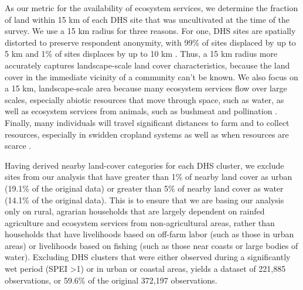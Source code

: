 \documentclass{article}
\begin{document}
As our metric for the availability of ecosystem services, we determine the fraction of land within 15 km of each DHS site that was uncultivated at the time of the survey.  We use a 15 km radius for three reasons.  For one, DHS sites are spatially distorted to preserve respondent anonymity, with 99\% of sites displaced by up to 5 km and 1\% of sites displaces by up to 10 km \cite{Grace2012}.  Thus, a 15 km radius more accurately captures landscape-scale land cover characteristics, because the land cover in the immediate vicinity of a community can't be known.  We also focus on a 15 km, landscape-scale area because many ecosystem services flow over large scales, especially abiotic resources that move through space, such as water, as well as ecosystem services from animals, such as bushmeat and pollination \cite{Lopez-Hoffman2010}.  Finally, many individuals will travel significant distances to farm and to collect resources, especially in swidden cropland systems as well as when resources are scarce \cite{Felardo2016, Arku2010}.

Having derived nearby land-cover categories for each DHS cluster, we exclude sites from our analysis that have greater than 1\% of nearby land cover as urban (19.1\% of the original data) or greater than 5\% of nearby land cover as water (14.1\% of the original data).  This is to ensure that we are basing our analysis only on rural, agrarian households that are largely dependent on rainfed agriculture and ecosystem services from non-agricultural areas, rather than households that have livelihoods based on off-farm labor (such as those in urban areas) or livelihoods based on fishing (such as those near coasts or large bodies of water).  Excluding DHS clusters that were either observed during a significantly wet period (SPEI \textgreater 1) or in urban or coastal areas, yields a dataset of 221,885 observations, or 59.6\% of the original 372,197 observations.
\end{document}
